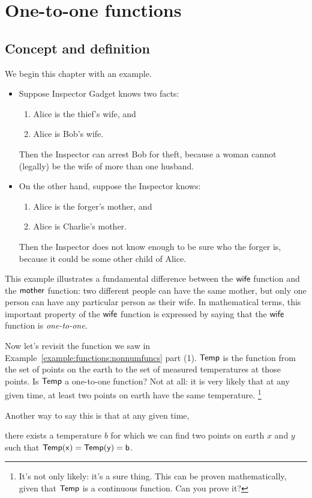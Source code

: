 \section{One-to-one functions}

\subsection{Concept and definition}

\medskip\noindent
We begin this chapter with an example.

\begin{example}{} 
\begin{itemize}
\item Suppose Inspector Gadget knows two facts:
\begin{enumerate}
\item Alice is the thief's wife,
and
\item Alice is Bob's wife.
\end{enumerate}
Then the Inspector can arrest Bob for theft,
because a woman cannot (legally) be the wife of more than one husband.

\item On the other hand, suppose the Inspector knows:
\begin{enumerate}
\item Alice is the forger's mother,
and
\item Alice is Charlie's mother.
\end{enumerate}
Then the Inspector does not know enough to be sure who the forger is,
because it could be some other child of Alice.
\end{itemize}
This example illustrates a fundamental difference between the $\sf{wife}$ function and the $\sf{mother}$ function: two different people can have the same mother, but only one person can have any particular person as their wife. 
In mathematical terms, this important property of the $\sf{wife}$ function is expressed by saying that the $\sf{wife}$ function is  \emph{one-to-one}.
\end{example}

\begin{example}{}
Now let's revisit the function we saw in Example~\ref{example:functions:nonnumfuncs} part (1).  $\sf{Temp}$ is the function from the set of points on the earth to the set of measured temperatures at those points.  Is $\sf{Temp}$ a one-to-one function?  Not at all: it is very likely that at any given time, at least two points on earth have the same temperature.  
\footnote{It's not only likely: it's a sure thing. This can be proven mathematically, given that $\sf{Temp}$ is a continuous function.  Can you prove it?}

Another way to say this is that at any given time, 

\begin{center}
there exists a temperature $b$ for which we can find two points on earth $x$ and $y$ such that  $\sf{Temp}(x) = \sf{Temp}(y) = b$.
\end{center}
\end{example}

